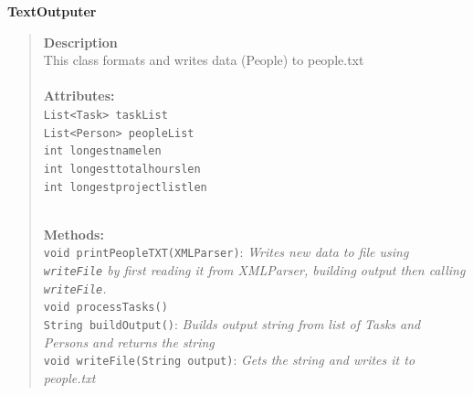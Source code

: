 \documentclass[12pt]{article}
\begin{document}
{\bf TextOutputer}
\begin{quote}
{\bf Description}\\
This class formats and writes data (People) to people.txt\\\\
{\bf Attributes:}\\
\texttt{List<Task> taskList}\\
\texttt{List<Person> peopleList}\\
\texttt{int longestnamelen}\\
\texttt{int longesttotalhourslen}\\
\texttt{int longestprojectlistlen }\\\\

\pagebreak

{\bf Methods:}\\
\texttt{void printPeopleTXT(XMLParser)}: \emph{Writes new data to file using \texttt{writeFile} by first reading it from XMLParser, building output then calling \texttt{writeFile}.}\\
\texttt{void processTasks() }\\
\texttt{String buildOutput()}: \emph{Builds output string from list of Tasks and Persons and returns the string} \\
\texttt{void writeFile(String output)}: \emph{Gets the string and writes it to people.txt}
\end{quote} 
\end{document}
